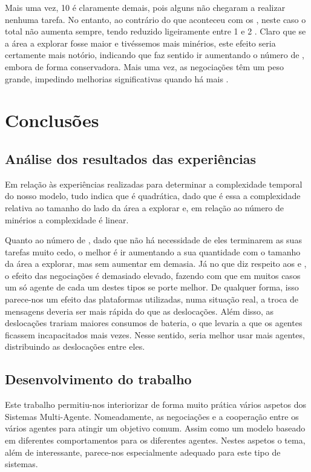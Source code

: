 \documentclass[12pt]{report}
\begin{document}
Mais uma vez, 10 \transporters é claramente demais, pois alguns não chegaram a realizar nenhuma tarefa. No entanto, ao contrário do que aconteceu com os \producers, neste caso o total não aumenta sempre, tendo reduzido ligeiramente entre 1 e 2 \transporters. Claro que se a área a explorar fosse maior e tivéssemos mais minérios, este efeito seria certamente mais notório, indicando que faz sentido ir aumentando o número de \transporters, embora de forma conservadora. Mais uma vez, as negociações têm um peso grande, impedindo melhorias significativas quando há mais \transporters.

\chapter{Conclusões}

\section{Análise dos resultados das experiências}

Em relação às experiências realizadas para determinar a complexidade temporal do nosso modelo, tudo indica que é quadrática, dado que é essa a complexidade relativa ao tamanho do lado da área a explorar e, em relação ao número de minérios a complexidade é linear.

Quanto ao número de \spotters, dado que não há necessidade de eles terminarem as suas tarefas muito cedo, o melhor é ir aumentando a sua quantidade com o tamanho da área a explorar, mas sem aumentar em demasia. Já no que diz respeito aos \producers e \transporters, o efeito das negociações é demasiado elevado, fazendo com que em muitos casos um só agente de cada um destes tipos se porte melhor. De qualquer forma, isso parece-nos um efeito das plataformas utilizadas, numa situação real, a troca de mensagens deveria ser mais rápida do que as deslocações. Além disso, as deslocações trariam maiores consumos de bateria, o que levaria a que os agentes ficassem incapacitados mais vezes. Nesse sentido, seria melhor usar mais agentes, distribuindo as deslocações entre eles.

\section{Desenvolvimento do trabalho}

Este trabalho permitiu-nos interiorizar de forma muito prática vários aspetos dos Sistemas Multi-Agente. Nomeadamente, as negociações e a cooperação entre os vários agentes para atingir um objetivo comum. Assim como um modelo baseado em diferentes comportamentos para os diferentes agentes. Nestes aspetos o tema, além de interessante, parece-nos especialmente adequado para este tipo de sistemas.
\end{document}
